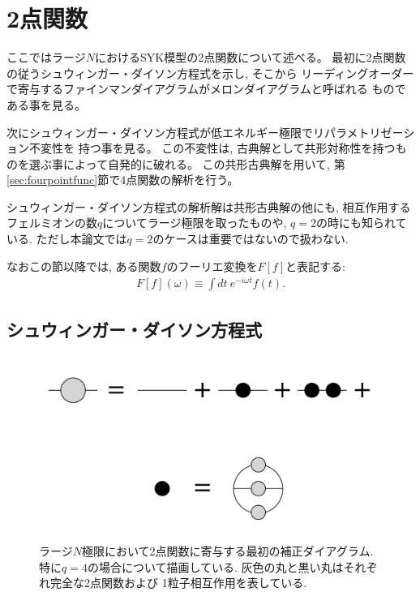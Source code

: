 \section{2点関数\label{sec:twopointfunc}}
ここではラージ$N$におけるSYK模型の2点関数について述べる。
最初に2点関数の従うシュウィンガー・ダイソン方程式を示し, そこから
リーディングオーダーで寄与するファインマンダイアグラムがメロンダイアグラムと呼ばれる
ものである事を見る。

次にシュウィンガー・ダイソン方程式が低エネルギー極限でリパラメトリゼーション不変性を
持つ事を見る。
この不変性は, 古典解として共形対称性を持つものを選ぶ事によって自発的に破れる。
この共形古典解を用いて, 第\ref{sec:fourpointfunc}節で4点関数の解析を行う。

シュウィンガー・ダイソン方程式の解析解は共形古典解の他にも, 
相互作用するフェルミオンの数$q$についてラージ極限を取ったものや, $q=2$の時にも知られている. 
ただし本論文では$q=2$のケースは重要ではないので扱わない. 

なおこの節以降では, ある関数$f$のフーリエ変換を$F[f]$と表記する:
\begin{align}
	F[f](\omega) \equiv \int dt\ e^{-i\omega t}f(t).
\end{align}

\subsection{シュウィンガー・ダイソン方程式}
\begin{figure}[ht]
  \centering
  \includegraphics[width=14cm]{figures/melonDiagram}
  \caption{ラージ$N$極限において2点関数に寄与する最初の補正ダイアグラム.
  特に$q=4$の場合について描画している. 灰色の丸と黒い丸はそれぞれ完全な2点関数および
  1粒子相互作用を表している.}
  \label{fig:melonDiagram}
\end{figure}

